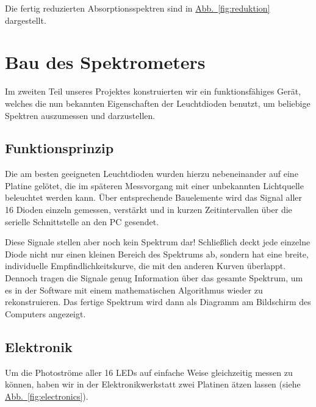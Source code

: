 \documentclass[11pt]{scrartcl}
\newcommand{\hypref}[2]{\hyperref[#2]{{#1}~\ref{#2}}}
\begin{document}
Die fertig reduzierten Absorptions\-spektren sind in \hypref{Abb.}{fig:reduktion} dargestellt.



\FloatBarrier
\section{Bau des Spektrometers}
Im zweiten Teil unseres Projektes konstruierten wir ein funktionsfähiges Gerät, welches die nun bekannten Eigenschaften der Leuchtdioden benutzt, um beliebige Spektren auszumessen und darzustellen.


\subsection{Funktionsprinzip} %
Die am besten geeigneten  Leuchtdioden wurden hierzu nebeneinander auf eine Platine gelötet, die im späteren Messvorgang mit einer unbekannten Lichtquelle beleuchtet werden kann.
Über entsprechende Bauelemente wird das Signal aller 16 Dioden einzeln gemessen, verstärkt und in kurzen Zeitintervallen über die serielle Schnittstelle an den PC gesendet.

Diese Signale stellen aber noch kein Spektrum dar! Schließlich deckt jede einzelne Diode nicht nur einen kleinen Bereich des Spektrums ab, sondern hat eine breite, individuelle Empfindlichkeitskurve, die mit den anderen Kurven überlappt.
Dennoch tragen die Signale genug Information über das gesamte Spektrum, um es in der Software mit einem mathematischen Algorithmus wieder zu rekonstruieren.
Das fertige Spektrum wird dann als Diagramm am Bildschirm des Computers angezeigt.


\subsection{Elektronik}

Um die Photoströme aller 16 LEDs auf einfache Weise gleichzeitig messen zu können, haben wir in der Elektronikwerkstatt zwei Platinen ätzen lassen (siehe \hypref{Abb.}{fig:electronics}).
\end{document}
